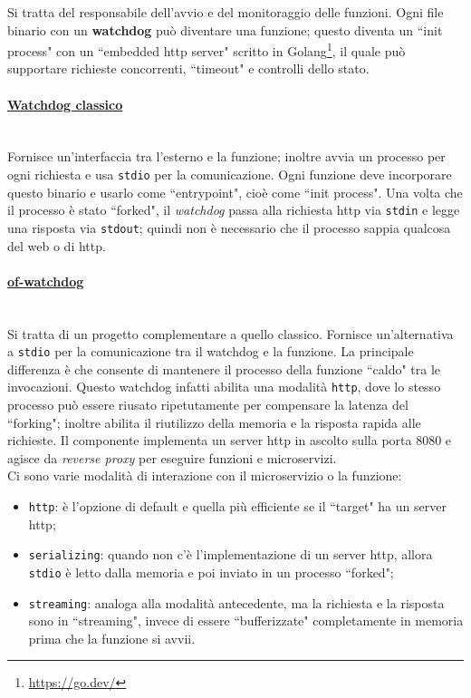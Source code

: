 \documentclass[12pt,a4paper,openany,twoside]{book}
\begin{document}
Si tratta del responsabile dell'avvio e del monitoraggio delle funzioni. Ogni file binario con un \textbf{watchdog} può diventare una funzione; questo diventa un ``init process" con un ``embedded \ac{http} server" scritto in Golang\footnote{\url{https://go.dev/}}, il quale può supportare richieste concorrenti, ``timeout" e controlli dello stato.

\paragraph{\underline{Watchdog classico}} ~\\
Fornisce un'interfaccia tra l'esterno e la funzione; inoltre avvia un processo per ogni richiesta e usa \texttt{stdio} per la comunicazione. Ogni funzione deve incorporare questo binario e usarlo come ``entrypoint", cioè come ``init process". Una volta che il processo è stato ``forked", il \textit{watchdog} passa alla richiesta \ac{http} via \texttt{stdin} e legge una risposta via \texttt{stdout}; quindi non è necessario che il processo sappia qualcosa del web o di \ac{http}.

\paragraph{\underline{of-watchdog}} ~\\
Si tratta di un progetto complementare a quello classico. Fornisce un'alternativa a \texttt{stdio} per la comunicazione tra il watchdog e la funzione. La principale differenza è che consente di mantenere il processo della funzione ``caldo" tra le invocazioni. Questo watchdog infatti abilita una modalità \texttt{http}, dove lo stesso processo può essere riusato ripetutamente per compensare la latenza del ``forking"; inoltre abilita il riutilizzo della memoria e la risposta rapida alle richieste. Il componente implementa un server \ac{http} in ascolto sulla porta 8080 e agisce da \textit{reverse proxy} per eseguire funzioni e microservizi.
\\
Ci sono varie modalità di interazione con il microservizio o la funzione:
\begin{itemize}
    \item \texttt{\ac{http}}: è l'opzione di default e quella più efficiente se il ``target" ha un server \ac{http};
    
    \item \texttt{serializing}: quando non c'è l'implementazione di un server \ac{http}, allora \texttt{stdio} è letto dalla memoria e poi inviato in un processo ``forked";
    
    \item \texttt{streaming}: analoga alla modalità antecedente, ma la richiesta e la risposta sono in ``streaming", invece di essere ``bufferizzate" completamente in memoria prima che la funzione si avvii. 
\end{itemize}
\end{document}
